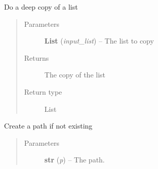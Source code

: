 \documentclass[a4paper,10pt,english]{sphinxmanual}
\begin{document}
\begin{fulllineitems}
\label{commands/apidoc/src:src.__init__.deepcopy_list}
Do a deep copy of a list
\begin{quote}\begin{description}
\item[{Parameters}] \leavevmode
\textbf{List} (\emph{input\_list}) -- The list to copy

\item[{Returns}] \leavevmode
The copy of the list

\item[{Return type}] \leavevmode
List

\end{description}\end{quote}

\end{fulllineitems}


\begin{fulllineitems}
\label{commands/apidoc/src:src.__init__.ensure_path_exists}
Create a path if not existing
\begin{quote}\begin{description}
\item[{Parameters}] \leavevmode
\textbf{str} (\emph{p}) -- The path.

\end{description}\end{quote}

\end{fulllineitems}

\end{document}

